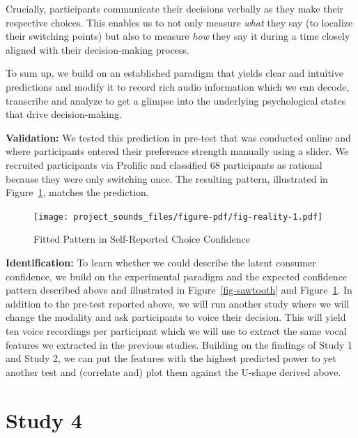 \documentclass[
  a4paper,
]{scrreprt}
\begin{document}
Crucially, participants communicate their decisions verbally as they
make their respective choices. This enables us to not only measure
\emph{what} they say (to localize their switching points) but also to
measure \emph{how} they say it during a time closely aligned with their
decision-making process.

To sum up, we build on an established paradigm that yields clear and
intuitive predictions and modify it to record rich audio information
which we can decode, transcribe and analyze to get a glimpse into the
underlying psychological states that drive decision-making.

\textbf{Validation:} We tested this prediction in pre-test that was
conducted online and where participants entered their preference
strength manually using a slider. We recruited participants via Prolific
and classified 68 participants as rational because they were only
switching once. The resulting pattern, illustrated in
Figure~\ref{fig-reality}, matches the prediction.

\begin{figure}

{\centering \texttt{[image: project\_sounds\_files/figure-pdf/fig-reality-1.pdf]}

}

\caption{\label{fig-reality}Fitted Pattern in Self-Reported Choice
Confidence}

\end{figure}

\textbf{Identification:} To learn whether we could describe the latent
consumer confidence, we build on the experimental paradigm and the
expected confidence pattern described above and illustrated in
Figure~\ref{fig-sawtooth} and Figure~\ref{fig-reality}. In addition to
the pre-test reported above, we will run another study where we will
change the modality and ask participants to voice their decision. This
will yield ten voice recordings per participant which we will use to
extract the same vocal features we extracted in the previous studies.
Building on the findings of Study 1 and Study 2, we can put the features
with the highest predicted power to yet another test and (correlate and)
plot them against the U-shape derived above.

\hypertarget{study-4}{%
\section{Study 4}\label{study-4}}
\end{document}
